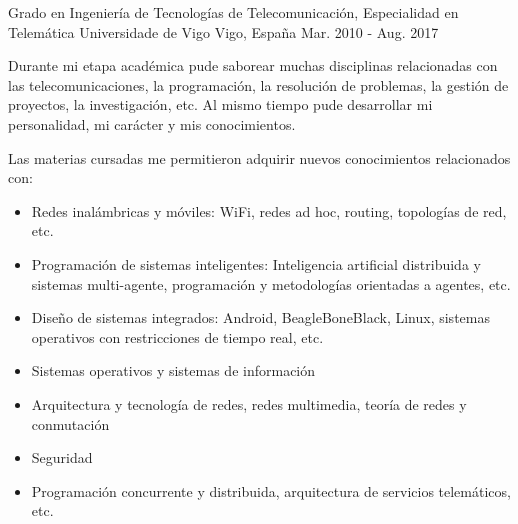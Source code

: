 

\begin{cventries}
  \cventry
    {Grado en Ingeniería de Tecnologías de Telecomunicación, Especialidad en Telemática}
    {Universidade de Vigo}
    {Vigo, España}
    {Mar. 2010 - Aug. 2017}
    {
      \begin{cvitems}
        \item {Durante mi etapa académica pude saborear muchas disciplinas relacionadas con las telecomunicaciones, la programación, la resolución de problemas, la gestión de proyectos, la investigación, etc. Al mismo tiempo pude desarrollar mi personalidad, mi carácter y mis conocimientos.}
        \item {Las materias cursadas me permitieron adquirir nuevos conocimientos relacionados con:}
        \begin{itemize}[label={---}]
          \item {Redes inalámbricas y móviles: WiFi, redes ad hoc, routing, topologías de red, etc.}
          \item {Programación de sistemas inteligentes: Inteligencia artificial distribuida y sistemas multi-agente, programación y metodologías orientadas a agentes, etc.}
          \item {Diseño de sistemas integrados: Android, BeagleBoneBlack, Linux, sistemas operativos con restricciones de tiempo real, etc.}
          \item {Sistemas operativos y sistemas de información}
          \item {Arquitectura y tecnología de redes, redes multimedia, teoría de redes y conmutación}
          \item {Seguridad}
          \item {Programación concurrente y distribuida, arquitectura de servicios telemáticos, etc.}
        \end{itemize}
      \end{cvitems}
    }
\end{cventries}
